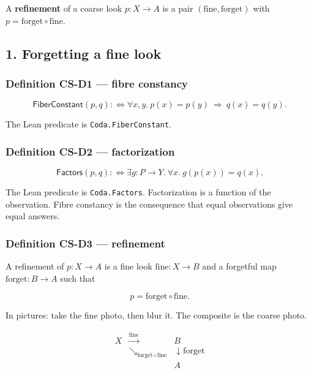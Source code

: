 \documentclass[
  11pt,
]{article}
\begin{document}
A \textbf{refinement} of a coarse look \(p:X\to A\) is a pair \((\mathrm{fine},\mathrm{forget})\) with \(p=\mathrm{forget}\circ\mathrm{fine}\).

\subsection{1. Forgetting a fine look}\label{forgetting-a-fine-look}

\subsubsection{Definition CS-D1 --- fibre constancy}\label{definition-cs-d1-fibre-constancy}

\[
\mathsf{FiberConstant}(p,q)
:\iff
\forall x,y.\ p(x)=p(y)\ \Rightarrow\ q(x)=q(y).
\]

The Lean predicate is \texttt{Coda.FiberConstant}.

\subsubsection{Definition CS-D2 --- factorization}\label{definition-cs-d2-factorization}

\[
\mathsf{Factors}(p,q)
:\iff
\exists g:P\to Y.\ \forall x.\ g(p(x))=q(x).
\]

The Lean predicate is \texttt{Coda.Factors}. Factorization is a function of the observation. Fibre constancy is the consequence that equal observations give equal answers.

\subsubsection{Definition CS-D3 --- refinement}\label{definition-cs-d3-refinement}

A refinement of \(p:X\to A\) is a fine look \(\mathrm{fine}:X\to B\) and a forgetful map \(\mathrm{forget}:B\to A\) such that

\[
p=\mathrm{forget}\circ\mathrm{fine}.
\]

In pictures: take the fine photo, then blur it. The composite is the coarse photo.

\[
\begin{array}{ccc}
X & \xrightarrow{\mathrm{fine}} & B \\
 & \searrow_{\mathrm{forget}\circ\mathrm{fine}} & \downarrow\mathrm{forget} \\
 & & A
\end{array}
\]
\end{document}
